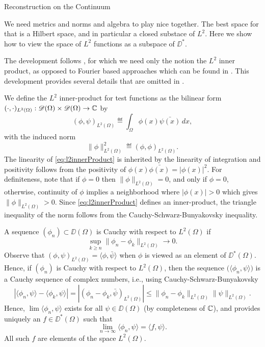 \begin{chapter}{Reconstruction on the Continuum}
\begin{com}
  We need metrics and norms and algebra to play nice together.
  The best space for that is a Hilbert space, and in particular a closed substace of $L^2$.
  Here we show how to view the space of $L^2$ functions as a subspace of $\DD^*$.
\end{com}
The development follows \citep{richtmyer1978principles}, for which we need only the notion the $L^2$ inner product, as opposed to Fourier based approaches which can be found in \citep{rudin1991,hormander1983}.
This development provides several details that are omitted in \citep{richtmyer1978principles}. 

We define the $L^2$ inner-product for test functions as the bilinear form $(\cdot,\cdot)_{L^2(\Omega)}:\mathscr D(\Omega)\times\mathscr D(\Omega) \to \mathbb C$ by 
\begin{equation} \label{eq:l2innerProduct}
  (\phi,\psi)_{L^2(\Omega)} \eqdef \int_{\Omega} \phi(x)\bar{\psi(x)}\,dx,
\end{equation}
with the induced norm 
\begin{equation} \label{eq:l2norm}
  \|\phi\|^2_{L^2(\Omega)} \eqdef (\phi,\phi)_{L^2(\Omega)}.
\end{equation}
The linearity of \eqref{eq:l2innerProduct} is inherited by the linearity of integration and positivity follows from the positivity of $\phi(x)\bar{\phi(x)} = |\phi(x)|^2$. 
For definiteness, note that if $\phi = 0$ then $\|\phi\|_{L^2(\Omega)} = 0$, and only if $\phi = 0$, otherwise, continuity of $\phi$ implies a neighborhood where $|\phi(x)| > 0$ which gives $\|\phi\|_{L^2(\Omega)} > 0$.
Since \eqref{eq:l2innerProduct} defines an inner-product, the triangle inequality of the norm follows from the Cauchy-Schwarz-Bunyakovsky inequality.

A sequence $(\phi_n)\subset \DD(\Omega)$ is Cauchy with respect to $L^2(\Omega)$ if
\begin{equation} 
  \sup_{k\ge n} \|\phi_n - \phi_k\|_{L^2(\Omega)} \to 0.
\end{equation}
Observe that $(\phi,\psi)_{L^2(\Omega)} = \langle \phi,\bar{\psi}\rangle$ when $\phi$ is viewed as an element of $\DD^*(\Omega)$.
Hence, if $(\phi_n)$ is Cauchy with respect to $L^2(\Omega)$, then the sequence $\big(\langle \phi_n,\psi\rangle\big)$ is a Cauchy sequence of complex numbers, i.e., using Cauchy-Schwarz-Bunyakovsky
\begin{equation}
  |\langle \phi_n, \psi \rangle - \langle \phi_k,\psi\rangle| 
    = |(\phi_n - \phi_k,\bar{\psi})_{L^2(\Omega)}|  
    \le \|\phi_n - \phi_k\|_{L^2(\Omega)}\|\psi\|_{L^2(\Omega)}. \label{eq:cauchySchwarz}
\end{equation}
Hence, $\lim\langle \phi_n,\psi\rangle$ exists for all $\psi \in \DD(\Omega)$ (by completeness of $\mathbb C$), and  provides uniquely an $f \in \DD^*(\Omega)$ such that
\begin{equation}
  \lim_{n\to\infty} \langle \phi_n, \psi\rangle = \langle f,\psi\rangle.
\end{equation}
All such $f$ are elements of the space $L^2(\Omega)$.


\end{chapter}
